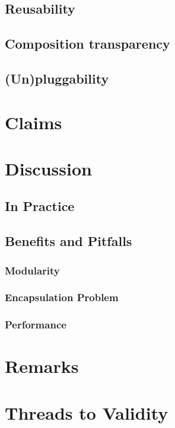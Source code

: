 \subsection{Reusability}
\subsection{Composition transparency}
\subsection{(Un)pluggability}

\section{Claims}\label{Evaluation Claims}

\section{Discussion}\label{Evaluation Discussion}
\subsection{In Practice}\label{Evaluation Practice}

\subsection{Benefits and Pitfalls}\label{Benefits and Pitfalls}

\subsubsection{Modularity}\label{Evaluation Modularity}

\subsubsection{Encapsulation Problem}

\subsubsection{Performance}\label{Evaluation Performance}

\section{Remarks}\label{Evaluation Remarks}

\section{Threads to Validity}

